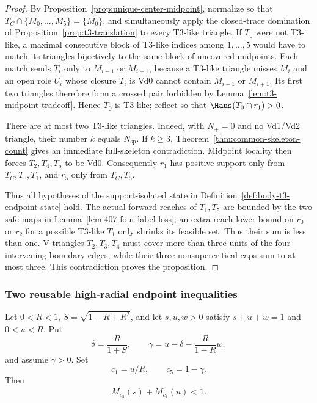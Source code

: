 \begin{proof}
By Proposition~\ref{prop:unique-center-midpoint}, normalize so that
$T_C\cap\{M_0,\ldots,M_5\}=\{M_0\}$, and simultaneously apply the
closed-trace domination of Proposition~\ref{prop:t3-translation} to every
T3-like triangle.  If $T_0$ were not T3-like, a maximal consecutive block of
T3-like indices among $1,\ldots,5$ would have to match its triangles bijectively
to the same block of uncovered midpoints.  Each match sends $T_i$ only to
$M_{i-1}$ or $M_{i+1}$, because a T3-like triangle misses $M_i$ and an
open role $U_i$ whose closure $T_i$ is Vd0 cannot contain $M_{i-1}$ or
$M_{i+1}$.
Its first two triangles therefore form a crossed pair
forbidden by Lemma~\ref{lem:t3-midpoint-tradeoff}.  Hence $T_0$ is T3-like;
reflect so that $\Haus(T_0\cap r_1)>0$.

There are at most two T3-like triangles. Indeed, with $N_+=0$ and no
Vd1/Vd2 triangle, their number $k$ equals $N_{\mathrm{sp}}$. If $k\ge3$,
Theorem~\ref{thm:common-skeleton-count} gives an immediate full-skeleton
contradiction.
Midpoint locality then forces $T_2,T_4,T_5$ to be Vd0.  Consequently $r_1$
has positive support only from $T_C,T_0,T_1$, and $r_5$ only from $T_C,T_5$.

Thus all hypotheses of the support-isolated state in
Definition~\ref{def:body-t3-endpoint-state} hold.  The actual forward reaches
of $T_1,T_5$ are bounded by the two safe maps in
Lemma~\ref{lem:407-four-label-loss}; an extra reach lower bound on $r_0$ or
$r_2$ for a possible T3-like $T_1$ only shrinks its feasible set.  Thus their sum is
less than one.  V triangles $T_2,T_3,T_4$ must cover more than three units of the
four intervening boundary edges, while their three nonsupercritical caps
sum to at most three.  This contradiction proves the proposition.
\end{proof}

\subsubsection{Two reusable high-radial endpoint inequalities}

\begin{lemma}
\label{lem:one-side-capped-loss}
\label{thm:s2-geom-e1}
Let $0<R<1$, $S=\sqrt{1-R+R^2}$, and let $s,u,w>0$ satisfy
$s+u+w=1$ and $0<u<R$.  Put
\[
 \delta=\frac{R}{1+S},\qquad
 \gamma=u-\delta-\frac{R}{1-R}w,
\]
and assume $\gamma>0$.  Set
\[
 c_1=u/R,\qquad c_5=1-\gamma.
\]
Then
\begin{equation}
 \overline M_{c_5}(s)+\overline M_{c_1}(u)<1.
 \label{eq:one-side-loss}
\end{equation}
\end{lemma}

